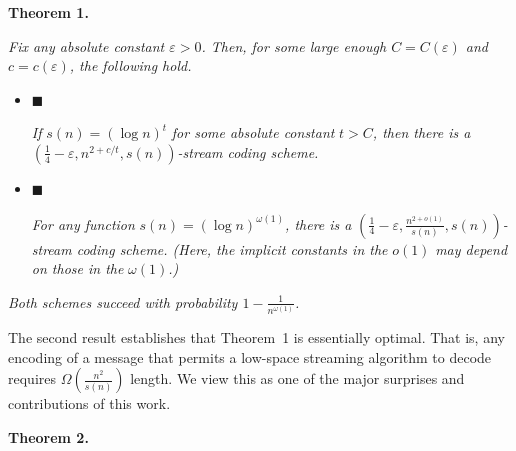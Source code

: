 \documentclass[10pt,a4paper]{article}
\begin{document}


\par\medskip\noindent\textbf{
\textbf{Theorem 1}\textbf{.}
}\par



\emph{Fix any absolute constant $\varepsilon>0$. Then, for some large enough
$C=C(\varepsilon)$ and $c=c(\varepsilon)$, the following hold.}\par


\begin{itemize}


\item[] 
$\blacksquare$ 


\emph{If }$s(n)=(\log n)^{t}$\emph{ for some absolute constant }$t>C$\emph{, then there is a }$\left(\frac{1}{4}-\varepsilon,n^{2+c/t},s(n)\right)$\emph{-stream coding scheme.}\par





\item[] 
$\blacksquare$ 


\emph{For any function }$s(n)=(\log n)^{\omega(1)}$\emph{, there is a }$\left(\frac{1}{4}-\varepsilon,\frac{n^{2+o(1)}}{s(n)},s(n)\right)$\emph{-stream coding scheme. (Here, the implicit constants in the }$o(1)$\emph{ may depend on those in the }$\omega(1)$\emph{.)}\par





\end{itemize}


\emph{Both schemes succeed with probability $1-\frac{1}{n^{\omega(1)}}$.}\par






The second result establishes that Theorem 1 is essentially optimal. That is, any encoding of a message that permits a low-space streaming algorithm to decode requires $\Omega\left(\frac{n^{2}}{s(n)}\right)$ length. We view this as one of the major surprises and contributions of this work.\par






\par\medskip\noindent\textbf{
\textbf{Theorem 2}\textbf{.}
}\par
\end{document}
